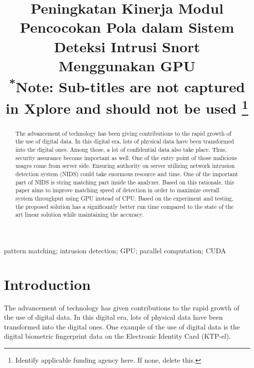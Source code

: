 \documentclass[conference]{IEEEtran}
\begin{document}
\title{Peningkatan Kinerja Modul Pencocokan Pola dalam Sistem Deteksi Intrusi Snort Menggunakan GPU\\
{\footnotesize \textsuperscript{*}Note: Sub-titles are not captured in Xplore and
should not be used}
\thanks{Identify applicable funding agency here. If none, delete this.}
}

\author{
\and
{}
}

\maketitle

\begin{abstract}
    The advancement of technology has been giving contributions to the rapid growth of the use of digital data. In this digital era, lots of physical data have been transformed into the digital ones. Among those, a lot of confidential data also take place. Thus, security assurance become important as well. One of the entry point of those malicious usages come from server side. Ensuring authority on server utilizing network intrusion detection system (NIDS) could take enormous resource and time. One of the important part of NIDS is string matching part inside the analyzer. Based on this rationale, this paper aims to improve matching speed of detection in order to maximize overall system throughput using GPU instead of CPU. Based on the experiment and testing, the proposed solution has a significantly better run time compared to the state of the art linear solution while maintaining the accuracy. 
\end{abstract}

\begin{IEEEkeywords}
    pattern matching; intrusion detection; GPU; parallel computation; CUDA
\end{IEEEkeywords}

\section{Introduction}
The advancement of technology has given contributions to the rapid growth of the use of digital data. In this digital era, lots of physical data have been transformed into the digital ones. One example of the use of digital data is the digital biometric fingerprint data on the Electronic Identity Card (KTP-el). 
\end{document}
